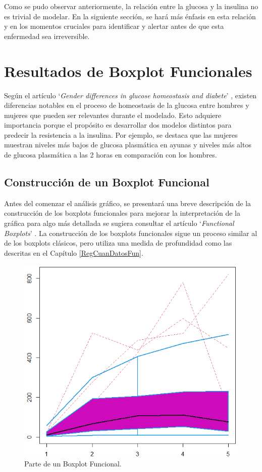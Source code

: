 Como se pudo observar anteriormente, la relación entre la glucosa y la insulina no es trivial de modelar. En la siguiente sección, se hará más énfasis en esta relación y en los momentos cruciales para identificar y alertar antes de que esta enfermedad sea irreversible.


\section{Resultados de Boxplot Funcionales}

Según el artículo `\textit{Gender differences in glucose homeostasis and diabete}' \cite{GenderDifferences2018}, existen diferencias notables en el proceso de homeostasis de la glucosa entre hombres y mujeres que pueden ser relevantes durante el modelado. Esto adquiere importancia porque el propósito es desarrollar dos modelos distintos para predecir la resistencia a la insulina. Por ejemplo, se destaca que las mujeres muestran niveles más bajos de glucosa plasmática en ayunas y niveles más altos de glucosa plasmática a las 2 horas en comparación con los hombres.

\subsection{Construcción de un Boxplot Funcional}

Antes del comenzar el análisis gráfico, se presentará una breve descripción de la construcción de los boxplots funcionales para mejorar la interpretación de la gráfica para algo más detallada se sugiera consultar el artículo `\textit{Functional Boxplots}' \cite{boxplotFun}. La construcción de los boxplots funcionales sigue un proceso similar al de los boxplots clásicos, pero utiliza una medida de profundidad como las descritas en el Capítulo \ref{RegCuanDatosFun}.

\begin{figure}[H]
    \centering
    \includegraphics[width=0.5\linewidth]{Imagenes/partes.png}
    \caption{Parte de un Boxplot Funcional.}
    \label{fig:bfpartes}
\end{figure}

